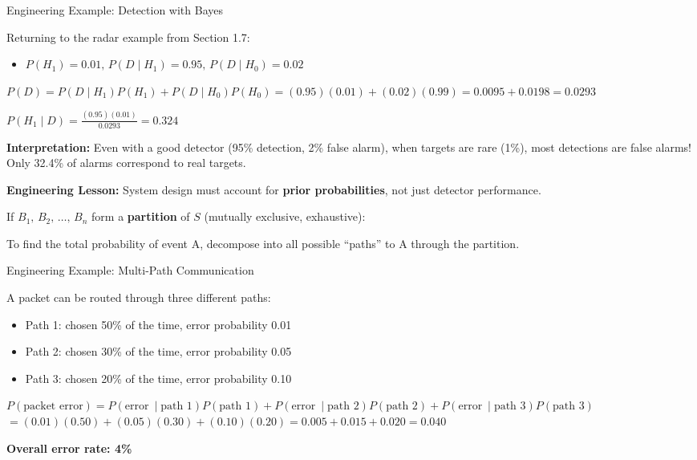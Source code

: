 \begin{PSbox}[unbreakable]{ex}{Engineering Example: Detection with Bayes}

Returning to the radar example from Section 1.7:

\begin{itemize}
\tightlist
\item
  $P(H_{1}) = 0.01,\, P(D \mid H_{1}) = 0.95,\, P(D \mid H_{0}) = 0.02$
\end{itemize}

$P(D) = P(D \mid H_{1})P(H_{1}) + P(D \mid H_{0})P(H_{0}) = (0.95)(0.01) + (0.02)(0.99) = 0.0095 + 0.0198 = 0.0293$

$\displaystyle P(H_{1} \mid D) = \frac{(0.95)(0.01)}{0.0293} = 0.324$

\textbf{Interpretation:} Even with a good detector (95\% detection, 2\% false alarm), when targets are rare (1\%), most detections are false alarms! Only 32.4\% of alarms correspond to real targets.

\textbf{Engineering Lesson:} System design must account for \textbf{prior probabilities}, not just detector performance.

\end{PSbox}



If $B_{1},\, B_{2},\, \ldots,\, B_{n}$ form a \textbf{partition} of $S$ (mutually exclusive, exhaustive):



To find the total probability of event A, decompose into all possible ``paths'' to A through the partition.

\begin{PSbox}[unbreakable]{ex}{Engineering Example: Multi-Path Communication}

A packet can be routed through three different paths:

\begin{itemize}
\tightlist
\item
  Path 1: chosen 50\% of the time, error probability 0.01
\item
  Path 2: chosen 30\% of the time, error probability 0.05
\item
  Path 3: chosen 20\% of the time, error probability 0.10
\end{itemize}

$P(\text{packet error}) = P(\text{error}\ \mid \text{path 1})P(\text{path 1}) + P(\text{error}\ \mid \text{path 2})P(\text{path 2}) + P(\text{error}\ \mid \text{path 3})P(\text{path 3})$\PSbr{}$= (0.01)(0.50) + (0.05)(0.30) + (0.10)(0.20)$\PSbr{}$= 0.005 + 0.015 + 0.020 = 0.040$

\textbf{Overall error rate: 4\%}

\end{PSbox}

